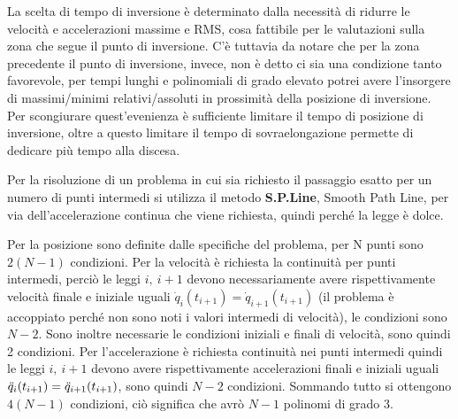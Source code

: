 La scelta di tempo di inversione è determinato dalla necessità di ridurre le velocità e accelerazioni massime e RMS, cosa fattibile per le valutazioni sulla zona che segue il punto di inversione. C'è tuttavia da notare che per la zona precedente il punto di inversione, invece, non è detto ci sia una condizione tanto favorevole, per tempi lunghi e polinomiali di grado elevato potrei avere l'insorgere di massimi/minimi relativi/assoluti in prossimità della posizione di inversione. Per scongiurare quest'evenienza è sufficiente limitare il tempo di posizione di inversione, oltre a questo limitare il tempo di sovraelongazione permette di dedicare più tempo alla discesa.

Per la risoluzione di un problema in cui sia richiesto il passaggio esatto per un numero di punti intermedi si utilizza il metodo \textbf{S.P.Line}, Smooth Path Line, per via dell'accelerazione continua che viene richiesta, quindi perché la legge è dolce.

Per la posizione sono definite dalle specifiche del problema, per N punti sono \(2(N-1)\) condizioni. Per la velocità è richiesta la continuità per punti intermedi, perciò le leggi \(i, \ i+1\) devono necessariamente avere rispettivamente velocità finale e iniziale uguali \(\dot{q}_i(t_{i+1})=\dot{q}_{i+1}(t_{i+1})\) (il problema è accoppiato perché non sono noti i valori intermedi di velocità), le condizioni sono \(N-2\). Sono inoltre necessarie le condizioni iniziali e finali di velocità, sono quindi 2 condizioni. Per l'accelerazione è richiesta continuità nei punti intermedi quindi le leggi \(i, \ i+1\) devono avere rispettivamente accelerazioni finali e iniziali uguali \(\Ddot{q}_i(t_{i+1})=\Ddot{q}_{i+1}(t_{i+1})\), sono quindi \(N-2\) condizioni.
Sommando tutto si ottengono \(4(N-1)\) condizioni, ciò significa che avrò \(N-1\) polinomi di grado 3. 

